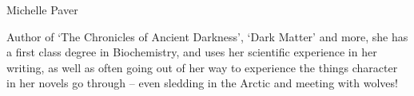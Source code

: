 {\Large Michelle Paver}

\begin{figure}
	\vspace{-10mm}
	\vspace{-10mm}
\end{figure}

Author of ‘The Chronicles of Ancient Darkness’, ‘Dark Matter’ and more, she has a first class degree in Biochemistry, and uses her scientific experience in her writing, as well as often going out of her way to experience the things character in her novels go through – even sledding in the Arctic and meeting with wolves!
